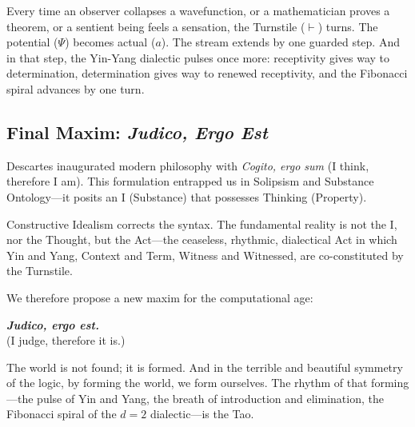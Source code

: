 \documentclass[12pt,a4paper]{article}
\newcommand{\turnstile}{\vdash}
\begin{document}
Every time an observer collapses a wavefunction, or a mathematician proves a theorem, or a sentient being feels a sensation, the Turnstile ($\turnstile$) turns. The potential ($\Psi$) becomes actual ($a$). The stream extends by one guarded step. And in that step, the Yin-Yang dialectic pulses once more: receptivity gives way to determination, determination gives way to renewed receptivity, and the Fibonacci spiral advances by one turn.


\subsection{Final Maxim: \emph{Judico, Ergo Est}}
\label{sec:maxim}

Descartes inaugurated modern philosophy with \emph{Cogito, ergo sum} (I think, therefore I am). This formulation entrapped us in Solipsism and Substance Ontology---it posits an I (Substance) that possesses Thinking (Property).

Constructive Idealism corrects the syntax. The fundamental reality is not the I, nor the Thought, but the Act---the ceaseless, rhythmic, dialectical Act in which Yin and Yang, Context and Term, Witness and Witnessed, are co-constituted by the Turnstile.

We therefore propose a new maxim for the computational age:

\begin{center}
\Large\textbf{\emph{Judico, ergo est.}}\\[4pt]
\normalsize (I judge, therefore it is.)
\end{center}

The world is not found; it is formed. And in the terrible and beautiful symmetry of the logic, by forming the world, we form ourselves. The rhythm of that forming---the pulse of Yin and Yang, the breath of introduction and elimination, the Fibonacci spiral of the $d = 2$ dialectic---is the Tao.


\end{document}
